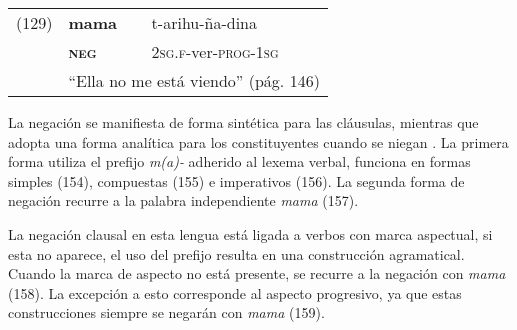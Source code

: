 {%
\begin{tabular}{lll}
(129) & \textbf{mama} & t-arihu-ña-dina \\
& \textsc{\textbf{neg}} & \textsc{2sg.f-}ver-\textsc{prog-1sg} \\
& \multicolumn{2}{l}{``Ella no me está viendo'' (pág. 146)}
\end{tabular} \vspace{0.3cm}

}

La negación se manifiesta de forma sintética para las cláusulas, mientras que adopta una forma analítica para los constituyentes cuando se niegan \textcolor{MidnightBlue}{\citep{garifuna}}. La primera forma utiliza el prefijo {\setmainfont{Charis SIL} \textit{m(a)-}} adherido al lexema verbal, funciona en formas simples (154), compuestas (155) e imperativos (156). La segunda forma de negación recurre a la palabra independiente {\setmainfont{Charis SIL} \textit{mama}} (157).

La negación clausal en esta lengua está ligada a verbos con marca aspectual, si esta no aparece, el uso del prefijo resulta en una construcción agramatical. Cuando la marca de aspecto no está presente, se recurre a la negación con {\setmainfont{Charis SIL} \textit{mama}} (158). La excepción a esto corresponde al aspecto progresivo, ya que estas construcciones siempre se negarán con {\setmainfont{Charis SIL} \textit{mama}} (159).